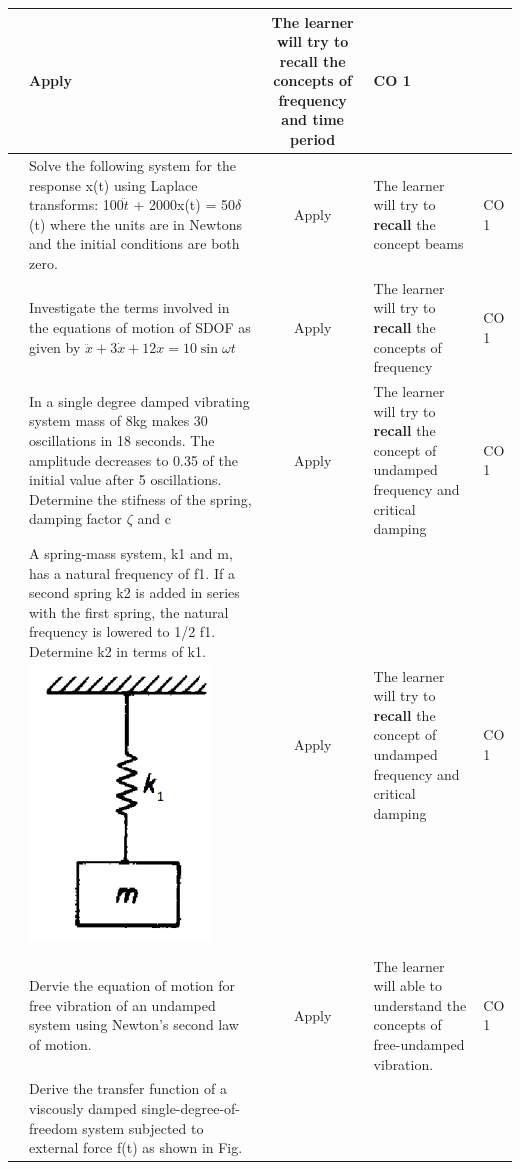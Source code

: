\documentclass[11pt,paper=a4,answers]{exam}
\begin{document}
\begin{flushleft}
\begin{longtable}{|>{\centering\arraybackslash}p{0.8cm}  | >{\raggedright\arraybackslash}p{6.5cm}  | c | >{\raggedright\arraybackslash}p{5cm} |>{\centering\arraybackslash}p{1cm}|}
	&	Apply&	The learner will try to \textbf{recall} the concepts of frequency and time period &	CO 1\\
		\hline 
		8& Solve the following system for the response x(t) using Laplace transforms:
		100$\ddot{t}$ + 2000x(t) = 50$\delta$(t)
		where the units are in Newtons and the initial conditions are both zero.
&	Apply&	The learner will try to \textbf{recall} the concept beams&	CO 1\\
		\hline 
		9& Investigate the terms involved in the equations of motion of SDOF as given by $\ddot{x}+3\dot{x}+12x=10\sin \omega t$
&	Apply&	The learner will try to \textbf{recall} the concepts of frequency  &	CO 1\\
		\hline
		10 & In a single degree damped vibrating  system mass of 8kg makes 30 oscillations in 18 seconds. The amplitude decreases to 0.35 of the initial value after 5 oscillations. Determine the stifness of the spring, damping factor $\zeta$ and c

&	Apply&	The learner will try to \textbf{recall} the concept of undamped frequency and critical damping&	CO 1\\
		\hline 	
		11 &	A spring-mass system, k1 and m, has a natural frequency of f1. If a second spring k2 is added in
		series with the first spring, the natural frequency is lowered to 1/2
		f1. Determine k2 in terms of k1.\includegraphics[scale=0.5]{90.png}&	Apply&	The learner will try to \textbf{recall} the concept of undamped frequency and critical damping&	CO 1\\
		\hline 	
			
		\multicolumn{5}{| c |}{\textcolor{red}{\textbf{PART-B LONG ANSWER QUESTIONS}}}\\
		\hline
		1& Dervie the equation of motion for free vibration of an undamped system using Newton's second law of motion.	&	Apply&	The learner will able to understand the concepts of free-undamped vibration.&	CO 1\\
		\hline 
		2& Derive the transfer function of a viscously damped single-degree-of-freedom system subjected to
		external force f(t) as shown in Fig. 
		

\end{longtable}
\end{flushleft}
\end{document}

